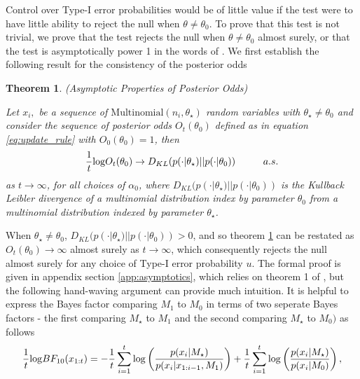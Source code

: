 \documentclass[11pt]{article}
\def\log{{\rm log}}
\newtheorem{thm}{Theorem}[section]
\begin{document}
Control over Type-I error probabilities would be of little value if the test were to have little ability to reject the null when $\theta \neq \theta_0$. To prove that this test is not trivial, we prove that the test rejects the null when $\theta \neq \theta_0$ almost surely, or that the test is asymptotically power 1 in the words of \cite{robbins}. We first establish the following result for the consistency of the posterior odds

\begin{thm}(Asymptotic Properties of Posterior Odds)
  
  \label{thm:consistency}
\noindent Let $x_i,$ be a sequence of $\text{Multinomial}(n_i,\theta_{\star})$ random variables with $\theta_{\star} \neq \theta_0$ and consider the sequence of posterior odds $O_t(\theta_0)$ defined as in equation \eqref{eq:update_rule} with $O_0(\theta_0)=1$, then
\begin{equation}
  \label{eq:consistency}
  \frac{1}{t} \log O_t(\theta_0) \rightarrow D_{KL}(p(\cdot|\theta_{\star}) || p(\cdot|\theta_0)) \hspace{1cm} a.s.
\end{equation}
as $t \rightarrow \infty$, for all choices of $\alpha_0$, where $D_{KL}(p(\cdot|\theta_{\star}) || p(\cdot|\theta_0))$ is the Kullback Leibler divergence of a multinomial distribution index by parameter $\theta_0$ from a multinomial distribution indexed by parameter $\theta_{\star}$. 
\end{thm}
\noindent When $\theta_{\star} \neq \theta_0$, $D_{KL}(p(\cdot|\theta_{\star}) || p(\cdot|\theta_0)) > 0$, and so theorem \ref{thm:consistency} can be restated as $O_t(\theta_0) \rightarrow \infty$ almost surely as $t \rightarrow \infty$, which consequently rejects the null almost surely for any choice of Type-I error probability $u$. The formal proof is given in appendix section \ref{app:asymptotics}, which relies on theorem 1 of \cite{walker}, but the following hand-waving argument can provide much intuition. It is helpful to express the Bayes factor comparing $M_1$ to $M_0$ in terms of two seperate Bayes factors - the first comparing $M_{\star}$ to $M_1$ and the second comparing $M_{\star}$ to $M_0)$ as follows
\begin{align*}
 \frac{1}{t} \log BF_{10}(x_{1:t}) = - \frac{1}{t}\sum_{i=1}^{t}\log \left( \frac{p(x_{i}|M_\star)}{p(x_{i}|x_{1:i-1},M_1)}\right) + \frac{1}{t}\sum_{i=1}^{t} \log  \left( \frac{p(x_{i}|M_\star)}{p(x_{i}|M_0)}\right),\\
\end{align*}
\end{document}
